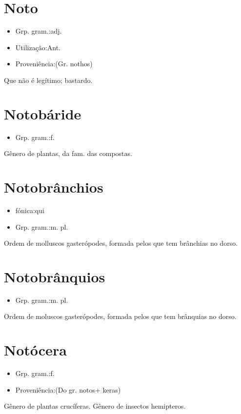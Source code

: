 \section{Noto}
\begin{itemize}
\item {Grp. gram.:adj.}
\end{itemize}
\begin{itemize}
\item {Utilização:Ant.}
\end{itemize}
\begin{itemize}
\item {Proveniência:(Gr. \textunderscore nothos\textunderscore )}
\end{itemize}
Que não é legítimo; bastardo.
\section{Notobáride}
\begin{itemize}
\item {Grp. gram.:f.}
\end{itemize}
Gênero de plantas, da fam. das compostas.
\section{Notobrânchios}
\begin{itemize}
\item {fónica:qui}
\end{itemize}
\begin{itemize}
\item {Grp. gram.:m. pl.}
\end{itemize}
Ordem de molluscos gasterópodes, formada pelos que tem brânchias no dorso.
\section{Notobrânquios}
\begin{itemize}
\item {Grp. gram.:m. pl.}
\end{itemize}
Ordem de moluscos gasterópodes, formada pelos que tem brânquias no dorso.
\section{Notócera}
\begin{itemize}
\item {Grp. gram.:f.}
\end{itemize}
\begin{itemize}
\item {Proveniência:(Do gr. \textunderscore notos\textunderscore  + \textunderscore keras\textunderscore )}
\end{itemize}
Gênero de plantas crucíferas.
Gênero de insectos hemipteros.
